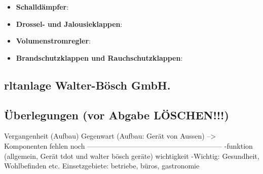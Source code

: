 \begin{itemize}
	\item \textbf{Schalldämpfer}:
	
	\item \textbf{Drossel- und Jalousieklappen}:
	
	\item \textbf{Volumenstromregler}:
	
	\item \textbf{Brandschutzklappen und Rauchschutzklappen}:
	
\end{itemize}

\cite{baunetz_bestandteile_nodate:o.J.}

\subsection{\ac{rltanlage} Walter-Bösch GmbH.}




\subsection{Überlegungen (vor Abgabe LÖSCHEN!!!)} 

Vergangenheit (Aufbau)
Gegenwart (Aufbau: Gerät von Aussen) --> Komponenten fehlen noch
---------------------------------------------------------
-funktion (allgemein, Gerät tdot und walter bösch geräte)
wichtigkeit 
-Wichtig: Gesundheit, Wohlbefinden etc.
Einsetzgebiete: betriebe, büros, gastronomie


